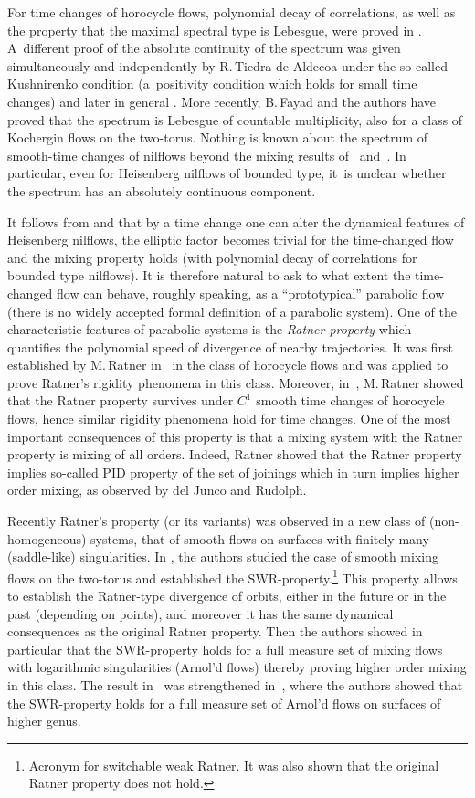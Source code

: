 \documentclass[10pt]{amsart}
\newcounter{case}
\theoremstyle{definition}
\theoremstyle{plain}
\begin{document}
For time changes of horocycle flows, polynomial decay of correlations, as well as the property that the maximal spectral type is Lebesgue, were proved in \cite{FU}. A~different proof of the absolute continuity of the spectrum
was given simultaneously and independently by R.\,Tiedra de Aldecoa \cite{Tie1} under the so-called Kushnirenko condition (a~positivity condition which holds for small time changes) and later in general \cite{Tie2}.
More recently, B.\,Fayad and the authors \cite{FFK} have proved that the spectrum is Lebesgue of countable multiplicity, also for a class of Kochergin flows on the two-torus. Nothing is known about the spectrum of smooth-time changes of nilflows beyond the mixing results of~\cite{AFU} and~\cite{FK}. In particular, even for Heisenberg nilflows of bounded type, it~is unclear whether the spectrum has an absolutely continuous component.

It follows from \cite{AFU} and \cite{FK} that by a time change one can alter the dynamical features of Heisenberg nilflows, \ie the elliptic factor becomes trivial for the time-changed flow and the mixing property holds (with polynomial decay of correlations for bounded type nilflows). It is therefore natural to ask to what extent the time-changed flow can behave, roughly speaking, as a ``prototypical'' parabolic flow (there is no widely accepted formal definition of a parabolic system). One of the characteristic features of parabolic systems is the \emph{Ratner property} which quantifies the polynomial speed of divergence of nearby trajectories. It was first established by
M.\,Ratner in~\cite{Rat1} in the class of horocycle flows and was applied to prove Ratner's rigidity phenomena in this class. Moreover, in~\cite{Rat2}, M.\,Ratner showed that the Ratner property survives under $C^1$ smooth time changes of horocycle flows, hence similar rigidity phenomena hold for time changes. One of the most important consequences of this property is that a mixing system with the Ratner property is mixing of all orders. Indeed, Ratner showed that the Ratner property implies so-called PID property of the set of joinings which in turn implies higher order mixing, as observed by del Junco and Rudolph.

Recently Ratner's property (or its variants) was observed in a new class of (non-homogeneous) systems, that of smooth flows on surfaces with finitely many (saddle-like) singularities. In \cite{FayKa}, the authors studied the case of smooth mixing flows on the two-torus and established the SWR-property.\footnote{Acronym for switchable weak Ratner. It was also shown that the original Ratner property does not hold.} This property allows to establish the Ratner-type divergence of orbits, either in the future or in the past (depending on points), and moreover it has the same dynamical consequences as the original Ratner property. Then the authors showed in particular that the SWR-property holds for a full measure set of mixing flows with logarithmic singularities (Arnol'd flows) thereby proving higher order mixing in this class. The result in~\cite{FayKa} was strengthened in~\cite{KKU}, where the authors showed that the SWR-property holds for a full measure set of Arnol'd flows on surfaces of higher genus.\enlargethispage{3pt}%
\end{document}
